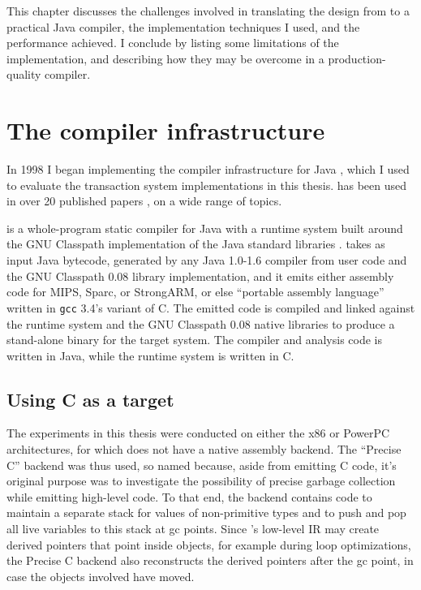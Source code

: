 This chapter discusses the challenges involved in translating the
design from  to a practical Java
compiler, the implementation techniques I used, and the performance
achieved.  I conclude by listing some limitations of the
implementation, and describing how they may be overcome in a
production-quality compiler.

\section{The \flex compiler infrastructure}
In 1998 I began implementing the \flex compiler infrastructure for
Java \cite{Flex}, which I used to evaluate the transaction system
implementations in this thesis.  \Flex has been used in over 20
published papers
\cite{DallmeierLiWaZe06,AnanianAsKuLeLi06,Ananian05,AnanianAsKuLeLi05,SalcianuRi05,RinardSaBu04,AnanianRi03,BoyapatiSaBeRi03,FeizabadiBeRaLiRi03,GheorghioiuSaRi03,ZeeRi02,WitchelCaAs02,Gheorghioiu02,Francu02,WitchelLaAnAs01,Whaley01,Salcianu01,BeebeeRi01,Beebee01,Klock01,SalcianuRi01,VivienRi01,Ananian99,WhaleyRi99},
on a wide range of topics.

\Flex is a whole-program static compiler for Java with a runtime
system built around the GNU Classpath implementation of the Java
standard libraries \cite{Classpath}.  \Flex takes as input Java
bytecode, generated by any Java 1.0-1.6 compiler from user code and
the GNU Classpath 0.08 library implementation, and it emits either
assembly code for MIPS, Sparc, or StrongARM, or else 
``portable assembly language'' written in \texttt{gcc} 3.4's variant
of C\@.  The emitted code is compiled and linked against the \flex runtime
system and the GNU Classpath 0.08 native libraries to produce a
stand-alone binary for the target system.  The \flex compiler and
analysis code is written in Java, while the \flex runtime system is
written in C\@.

\subsection*{Using C as a target}\label{sec:precisec}
The experiments in this thesis were conducted on either the x86 or
PowerPC architectures, for which \flex does not have a native assembly
backend.  The ``Precise C'' backend was thus used, so named because,
aside from emitting C code, it's original purpose was to investigate
the possibility of precise garbage collection while emitting
high-level code.  To that end, the backend contains code to maintain a
separate stack for values of non-primitive types and to push and pop
all live variables to this stack at gc points.  Since \flex's low-level
IR may create derived pointers that point inside objects, for example
during loop optimizations, the Precise C backend also reconstructs
the derived pointers after the gc point, in case the objects involved
have moved.\label{sec:precise-gc}

